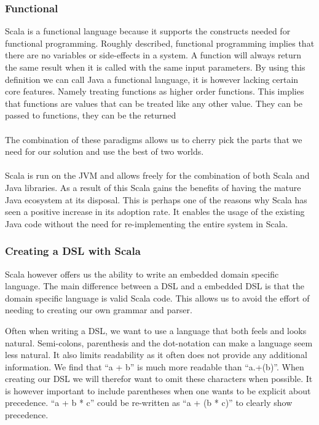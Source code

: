 \subsubsection{Functional}
Scala is a functional language because it supports the constructs needed for functional programming. Roughly described, functional programming implies that there are no variables or side-effects in a system. A function will always return the same result when it is called with the same input parameters. By using this definition we can call Java a functional language, it is however lacking certain core features. Namely treating functions as higher order functions. This implies that functions are values that can be  treated like any other value. They can be passed to functions, they can be the returned 
\\\\
The combination of these paradigms allows us to cherry pick the parts that we need for our solution and use the best of two worlds.
\\\\
Scala is run on the JVM and allows freely for the combination of both Scala and Java libraries. As a result of this Scala gains the benefits of having the mature Java ecosystem at its disposal. This is perhaps one of the reasons why Scala has seen a positive increase in its adoption rate. It enables the usage of the existing Java code without the need for re-implementing the entire system in Scala.

\subsubsection{Creating a DSL with Scala}
Scala however offers us the ability to write an embedded domain specific language. The main difference between a DSL and a embedded DSL is that the domain specific language is valid Scala code. This allows us to avoid the effort of needing to creating our own grammar and parser. 

Often when writing a DSL, we want to use a language that both feels and looks natural. Semi-colons, parenthesis and the dot-notation can make a language seem less natural. It also limits readability as it often does not provide any additional information. We find that ``a + b'' is much more readable than ``a.+(b)''. When creating our DSL we will therefor want to omit these characters when possible. It is however important to include parentheses when one wants to be explicit about precedence. ``a + b * c'' could be re-written as ``a + (b * c)'' to clearly show precedence.

